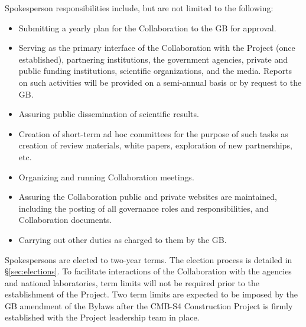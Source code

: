 \documentclass[12pt]{article}
\newcommand{\exec}{{Executive Team}}
\begin{document}
Spokesperson responsibilities include, but are not limited to the following: 
\begin{itemize}
\item Submitting a yearly plan for the Collaboration to the GB for approval. 
\item Serving as the primary interface of the Collaboration with the Project (once established), partnering institutions, the government agencies, private and public funding institutions, scientific organizations, and the media. Reports on such activities will be provided on a semi-annual basis or by request to the GB.
\item Assuring public dissemination of scientific results. 
\item Creation of short-term ad hoc committees for the purpose of such tasks as creation of review materials, white papers, exploration of new partnerships, etc.
\item Organizing and running Collaboration meetings. 

\item Assuring the Collaboration public and private websites are maintained, including the posting of all governance roles and responsibilities, and Collaboration documents. 

\item Carrying out other duties as charged to them by the GB. 



\end{itemize}

Spokespersons are elected to two-year terms. The election process is detailed in \S\ref{sec:elections}.   To facilitate interactions of the Collaboration with the agencies and national laboratories, term limits will not be required prior to the establishment of the Project.  Two term limits are expected to be imposed by the GB amendment of the Bylaws after the CMB-S4 Construction Project is firmly established with the Project leadership team in place. 
\end{document}
